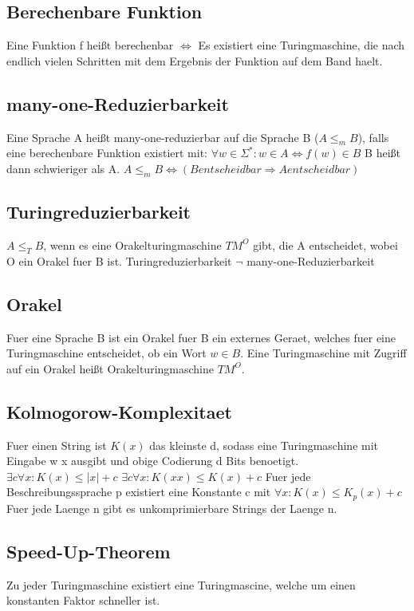 \documentclass[a4paper]{scrreprt}
\begin{document}
\subsection{Berechenbare Funktion}
Eine Funktion f heißt berechenbar $\Leftrightarrow$ Es existiert eine Turingmaschine, die nach endlich vielen Schritten mit dem Ergebnis der Funktion auf dem Band haelt.

\subsection{many-one-Reduzierbarkeit}
Eine Sprache A heißt many-one-reduzierbar auf die Sprache B ($A \le_m B$), falls eine berechenbare Funktion existiert mit:
$\forall w \in \Sigma^*: w \in A \Leftrightarrow f(w) \in B$
B heißt dann schwieriger als A.
$A \le_m B \Leftrightarrow (B entscheidbar \Rightarrow A entscheidbar)$

\subsection{Turingreduzierbarkeit}
$A \le_T B$, wenn es eine Orakelturingmaschine $TM^O$ gibt, die A entscheidet, wobei O ein Orakel fuer B ist.
Turingreduzierbarkeit $\neg$ many-one-Reduzierbarkeit

\subsection{Orakel}
Fuer eine Sprache B ist ein Orakel fuer B ein externes Geraet, welches fuer eine Turingmaschine entscheidet, ob ein Wort $w \in B$.
Eine Turingmaschine mit Zugriff auf ein Orakel heißt Orakelturingmaschine $TM^O$.

\subsection{Kolmogorow-Komplexitaet}
Fuer einen String ist $K(x)$ das kleinste d, sodass eine Turingmaschine mit Eingabe w x ausgibt und obige Codierung d Bits benoetigt.
$\exists c \forall x: K(x) \le |x| + c$
$\exists c \forall x: K(xx) \le K(x) + c$
Fuer jede Beschreibungssprache p existiert eine Konstante c mit $\forall x: K(x) \le K_p(x) + c$
Fuer jede Laenge n gibt es unkomprimierbare Strings der Laenge n.

\subsection{Speed-Up-Theorem}
Zu jeder Turingmaschine existiert eine Turingmascine, welche um einen konstanten Faktor schneller ist.
\end{document}
